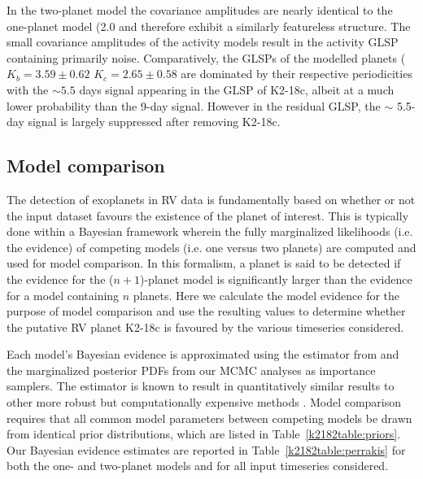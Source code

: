 In the two-planet model the covariance amplitudes are nearly identical to the one-planet model (2.0 \mps{)}
and therefore exhibit a similarly featureless structure. The small covariance amplitudes of the activity
models result in the activity GLSP containing primarily noise. Comparatively, the GLSPs of the modelled planets
($K_b=3.59\pm 0.62$ \mps{,} $K_c=2.65\pm 0.58$ \mps{)} are dominated
by their respective periodicities with the $\sim 5.5$ days signal appearing in the GLSP
of K2-18c, albeit at a much lower probability than the 9-day signal. However in the residual GLSP, the
$\sim$ 5.5-day signal is largely suppressed after removing K2-18c. 

\subsection{Model comparison} \label{k2182sect:evidence}
The detection of exoplanets in RV data is fundamentally based on whether or not the input dataset favours the
existence of the planet of interest. This is typically done within a Bayesian framework wherein the fully marginalized
likelihoods (i.e. the evidence) of competing models (i.e. one versus two planets) are computed and used for model comparison.
In this formalism, a planet is said to be detected if the evidence for the ($n+1$)-planet model is significantly larger
than the evidence for a model containing $n$ planets. Here we calculate the model evidence for the purpose of model
comparison and use the resulting values to determine whether  the putative RV planet K2-18c is favoured by
the various timeseries considered.

Each model's Bayesian evidence is approximated using the estimator from \cite{perrakis13} and the marginalized
posterior PDFs from our MCMC analyses as importance samplers. The \cite{perrakis13} estimator is known to result in
quantitatively similar results to other more robust but computationally expensive methods
\citep[e.g. nested samplers;][]{nelson18}. Model comparison requires that all common model parameters
between competing models be drawn from identical prior distributions, which are  listed in
Table~\ref{k2182table:priors}. Our Bayesian evidence estimates are reported in Table~\ref{k2182table:perrakis} for both the one-
and two-planet models and for all input timeseries considered.

